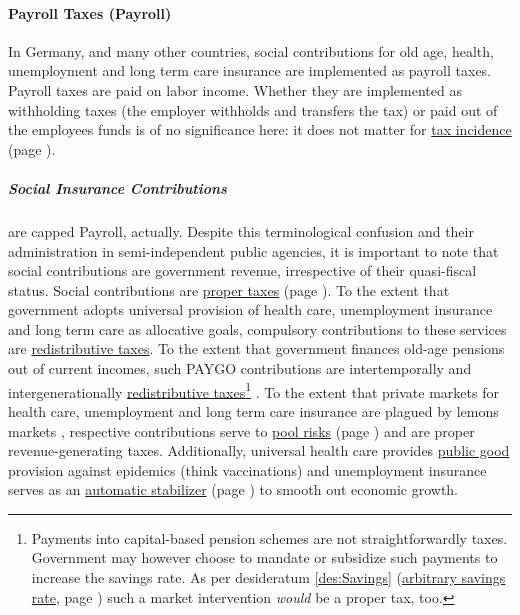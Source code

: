 \paragraph{Payroll Taxes (Payroll)}  \label{sec:Payroll} In Germany, and many other countries, social contributions for old age, health, unemployment and long term care insurance are implemented as payroll taxes.
Payroll taxes are paid on labor income.
Whether they are implemented as withholding taxes (the employer withholds and transfers the tax) or paid out of the employees funds is of no significance here:
it does not matter for \hyperref[sec:TaxIncidence]{tax incidence} (page \pageref{sec:TaxIncidence}).

\subparagraph{Social Insurance Contributions}  \label{sec:SIC} are capped  \gls{Payroll}, actually.
Despite this terminological confusion and their administration in semi-independent public agencies, it is important to note that social contributions are government revenue, irrespective of their quasi-fiscal status.
Social contributions are \hyperref[sec:PurposesOfTaxation]{proper taxes} (page \pageref{sec:PurposesOfTaxation}).
To the extent that government adopts universal provision of health care, unemployment insurance and long term care as allocative goals, compulsory contributions to these services are \hyperref[sec:Redistribution]{redistributive taxes}.
To the extent that government finances old-age pensions out of current incomes, such PAYGO contributions are intertemporally and intergenerationally \hyperref[sec:Redistribution]{redistributive taxes}\footnote
{
	Payments into capital-based pension schemes are not straightforwardly taxes.
	Government may however choose to mandate or subsidize such payments to increase the savings rate.
	As per desideratum \ref{des:Savings} (\hyperref[des:Savings]{arbitrary savings rate}, page \pageref{des:Savings}) such a market intervention \emph{would} be a proper tax, too.
}
.
To the extent that private markets for health care, unemployment and long term care insurance are plagued by lemons markets \citep{Akerlof-1970-aa}, respective contributions serve to \hyperref[sec:RiskPooling]{pool risks} (page \pageref{sec:RiskPooling}) and are proper revenue-generating taxes.
Additionally, universal health care provides \hyperref[sec:PublicGood]{public good} provision against epidemics (think vaccinations) and unemployment insurance serves as an \hyperref[des:AutomaticStabilizer]{automatic stabilizer} (page \pageref{des:AutomaticStabilizer}) to smooth out economic growth.

